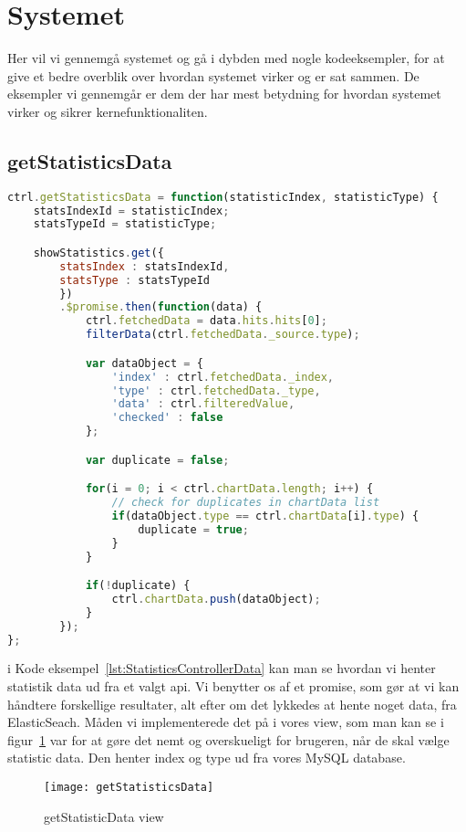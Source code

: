 \section{Systemet}
Her vil vi gennemgå systemet og gå i dybden med nogle kodeeksempler, for at give et bedre overblik over hvordan systemet virker og er sat sammen.
De eksempler vi gennemgår er dem der har mest betydning for hvordan systemet virker og sikrer kernefunktionaliten.
\subsection{getStatisticsData}
\begin{lstlisting}[caption={getStatisticsData}, language={JavaScript}, label={lst:StatisticsControllerData}]
ctrl.getStatisticsData = function(statisticIndex, statisticType) {
    statsIndexId = statisticIndex;
    statsTypeId = statisticType;

    showStatistics.get({
        statsIndex : statsIndexId,
        statsType : statsTypeId
        })
        .$promise.then(function(data) {
            ctrl.fetchedData = data.hits.hits[0];
            filterData(ctrl.fetchedData._source.type);

            var dataObject = {
                'index' : ctrl.fetchedData._index,
                'type' : ctrl.fetchedData._type,
                'data' : ctrl.filteredValue,
                'checked' : false
            };

            var duplicate = false;

            for(i = 0; i < ctrl.chartData.length; i++) {
                // check for duplicates in chartData list
                if(dataObject.type == ctrl.chartData[i].type) {
                    duplicate = true;
                }
            }

            if(!duplicate) {
                ctrl.chartData.push(dataObject);
            }
        });
};
\end{lstlisting}
i Kode eksempel~\ref{lst:StatisticsControllerData} kan man se hvordan vi henter statistik data ud fra et valgt api.
Vi benytter os af et promise, som gør at vi kan håndtere forskellige resultater, alt efter om det lykkedes at hente noget data, fra ElasticSeach.
Måden vi implementerede det på i vores view, som man kan se i figur~\ref{fig:getStatisticsData} var for at gøre det nemt og overskueligt for brugeren,
når de skal vælge statistic data.
Den henter index og type ud fra vores MySQL database.
\begin{figure}[H]
\texttt{[image: getStatisticsData]}
\caption{getStatisticData view}
\label{fig:getStatisticsData}
\end{figure}
